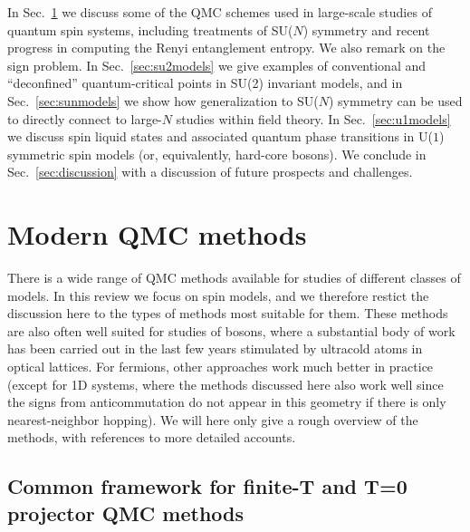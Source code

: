 \documentclass[range]{ar2e}
\begin{document}
In Sec.~\ref{sec:methods} we discuss some of the QMC schemes used in large-scale studies of quantum spin systems, including treatments
of SU($N$) symmetry and recent progress in computing the Renyi entanglement entropy. We also remark on the sign problem. In 
Sec.~\ref{sec:su2models} we give examples of conventional and ``deconfined'' quantum-critical points in SU(2) invariant models, and in 
Sec.~\ref{sec:sunmodels} we show how generalization to SU($N$) symmetry can be used to directly connect to large-$N$ studies within
field theory. In Sec.~\ref{sec:u1models} we discuss spin liquid states and associated quantum phase transitions in U($1$) symmetric spin
models (or, equivalently, hard-core bosons). We conclude in Sec.~\ref{sec:discussion} with a discussion of future prospects and challenges.

\section{Modern QMC methods}
\label{sec:methods}

There is a wide range of QMC methods available for studies of different classes of models. In this review we focus on spin models, and we 
therefore restict the discussion here to the types of methods most suitable for them. These methods are also often well suited for studies of 
bosons, where a substantial body of work has been carried out in the last few years stimulated by ultracold atoms in optical lattices. For 
fermions, other approaches work much better in practice (except for 1D systems, where the methods discussed here also work well since the signs 
from anticommutation do not appear in this geometry if there is only nearest-neighbor hopping). We will here only give a rough overview of the 
methods, with references to more detailed accounts.

\subsection{Common framework for finite-T and T=0 projector QMC methods}
\label{ss:method}
\end{document}
